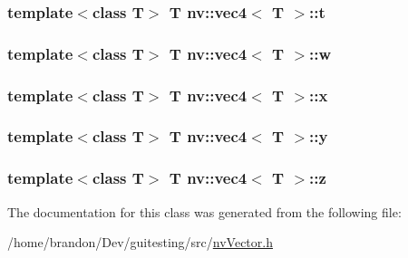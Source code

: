 \hypertarget{classnv_1_1vec4_89a4682a6fae5210e042020eae36c6a1}{
\subsubsection[{t}]{\setlength{\rightskip}{0pt plus 5cm}template$<$class T$>$ T {\bf nv::vec4}$<$ T $>$::{\bf t}}}
\label{classnv_1_1vec4_89a4682a6fae5210e042020eae36c6a1}


\hypertarget{classnv_1_1vec4_3f951f25ac6af5c0ea919e52f572f834}{
\subsubsection[{w}]{\setlength{\rightskip}{0pt plus 5cm}template$<$class T$>$ T {\bf nv::vec4}$<$ T $>$::{\bf w}}}
\label{classnv_1_1vec4_3f951f25ac6af5c0ea919e52f572f834}


\hypertarget{classnv_1_1vec4_ebca1c5ded6f9fc33a18c6c445788ae0}{
\subsubsection[{x}]{\setlength{\rightskip}{0pt plus 5cm}template$<$class T$>$ T {\bf nv::vec4}$<$ T $>$::{\bf x}}}
\label{classnv_1_1vec4_ebca1c5ded6f9fc33a18c6c445788ae0}


\hypertarget{classnv_1_1vec4_84d82fa7546ebcecdeee30e455faace8}{
\subsubsection[{y}]{\setlength{\rightskip}{0pt plus 5cm}template$<$class T$>$ T {\bf nv::vec4}$<$ T $>$::{\bf y}}}
\label{classnv_1_1vec4_84d82fa7546ebcecdeee30e455faace8}


\hypertarget{classnv_1_1vec4_6dd15318e5ada1377b6910db6e592999}{
\subsubsection[{z}]{\setlength{\rightskip}{0pt plus 5cm}template$<$class T$>$ T {\bf nv::vec4}$<$ T $>$::{\bf z}}}
\label{classnv_1_1vec4_6dd15318e5ada1377b6910db6e592999}




The documentation for this class was generated from the following file:\begin{CompactItemize}
\item 
/home/brandon/Dev/guitesting/src/\hyperlink{nv_vector_8h}{nvVector.h}\end{CompactItemize}
